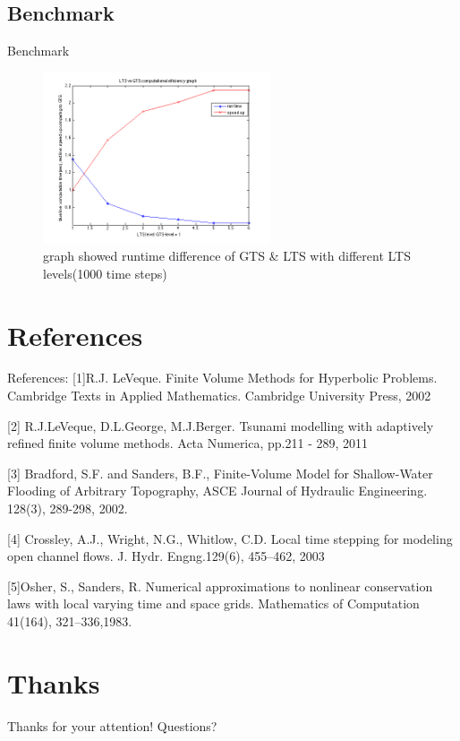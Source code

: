 \documentclass{beamer}
\begin{document}
\subsection{Benchmark}
\begin{frame}{Benchmark}
\begin{figure}[p]
    \centering
    \includegraphics[width=0.6\textwidth]{LTS_runtime}
    \caption{graph showed runtime difference of GTS \& LTS with different LTS levels(1000 time steps)}
    \label{fig:awesome_image}
\end{figure}
\end{frame}

\section[]{References}

\begin{frame}[t]{References:}
[1]R.J. LeVeque. Finite Volume Methods for Hyperbolic Problems. Cambridge Texts in Applied Mathematics. Cambridge University Press, 2002
    
[2] R.J.LeVeque, D.L.George, M.J.Berger. Tsunami modelling with adaptively refined finite volume methods. Acta Numerica, pp.211 - 289, 2011

[3] Bradford, S.F. and Sanders, B.F., Finite-Volume Model for Shallow-Water Flooding of Arbitrary Topography, ASCE Journal of Hydraulic Engineering. 128(3), 289-298, 2002.

[4] Crossley, A.J., Wright, N.G., Whitlow, C.D. Local time stepping for modeling open channel flows. J. Hydr. Engng.129(6), 455–462, 2003

[5]Osher, S., Sanders, R. Numerical approximations to nonlinear conservation laws with local varying time and space grids. Mathematics of Computation 41(164), 321–336,1983.
\end{frame}

\section*{Thanks}

\begin{frame}[t]{Thanks for your attention! Questions?}

\end{frame}
\end{document}
